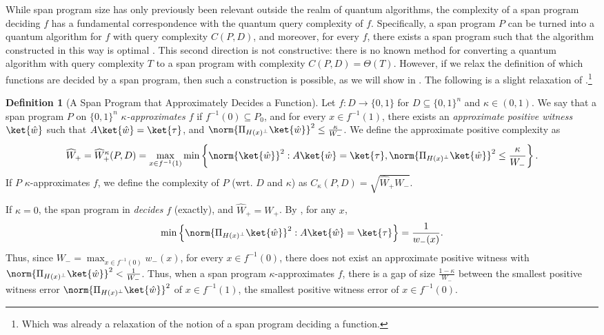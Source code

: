 \documentclass[11pt]{article}
\numberwithin{equation}{section}
\theoremstyle{definition}
\newtheorem{definition}[theorem]{Definition}
\theoremstyle{plain}
\begin{document}
While span program size has only previously been relevant outside the realm of quantum algorithms, the complexity of a span program deciding $f$ has a fundamental correspondence with the quantum query complexity of $f$.  Specifically, a span program $P$ can be turned into a quantum algorithm for $f$ with query complexity $C(P,D)$, and moreover, for every $f$, there exists a span program such that the algorithm constructed in this way is optimal \cite{Rei09}. This second direction is not constructive: there is no known method for converting a quantum algorithm with query complexity $T$ to a span program with complexity $C(P,D)=\Theta(T)$. However, if we relax the definition of which functions are decided by a span program, then such a construction is possible, as we will show in . The following is a slight relaxation of \cite[Definition~2.6]{IJ15}.\footnote{Which was already a relaxation of the notion of a span program deciding a function.} %

\begin{definition}[A Span Program that Approximately Decides a Function]\label{def:approx-span}
Let $f:D\rightarrow\{0,1\}$ for $D\subseteq \{0,1\}^n$ and $\kappa\in(0,1)$. We say that a span program $P$ on $\{0,1\}^n$ \emph{$\kappa$-approximates $f$} if $f^{-1}(0)\subseteq P_0$, and for every $x\in f^{-1}(1)$, there exists an \emph{approximate positive witness} $\ket{\hat{w}}$ such that $A\ket{\hat{w}}=\ket{\tau}$, and $\norm{\Pi_{H(x)^\bot}\ket{\hat{w}}}^2\leq \frac{\kappa}{W_-}$. We define the approximate positive complexity as 
$$\widehat{W}_+=\widehat{W}_+^{\kappa}(P,D)=\max_{x\in f^{-1}(1)}\min\left\{\norm{\ket{\hat w}}^2 : A\ket{\hat w}=\ket{\tau}, \norm{\Pi_{H(x)^\bot}\ket{\hat{w}}}^2\leq \frac{\kappa}{W_-}\right\}.$$
If $P$ $\kappa$-approximates $f$, we define the complexity of $P$ (wrt. $D$ and $\kappa$) as $C_{\kappa}(P,D)=\sqrt{\widehat{W}_+W_-}$.
\end{definition}

If $\kappa=0$, the span program in  \emph{decides} $f$ (exactly), and $\widehat{W}_+=W_+$. By \cite[Theorem 2.10]{IJ15}, for any $x$,
$$\min\left\{\norm{\Pi_{H(x)^\bot}\ket{\hat{w}}}^2:A\ket{\hat{w}}=\ket{\tau}\right\}=\frac{1}{w_-(x)}.$$
Thus, since $W_-=\max_{x\in f^{-1}(0)}w_-(x)$, for every $x\in f^{-1}(0)$, there does not exist an approximate positive witness with $\norm{\Pi_{H(x)^\bot}\ket{\hat{w}}}^2<\frac{1}{W_-}$. Thus, when a span program $\kappa$-approximates $f$, there is a gap of size $\frac{1-\kappa}{W_-}$ between the smallest positive witness error $\norm{\Pi_{H(x)^\bot}\ket{\hat{w}}}^2$ of $x\in f^{-1}(1)$, the smallest positive witness error of $x\in f^{-1}(0)$. 
\end{document}
